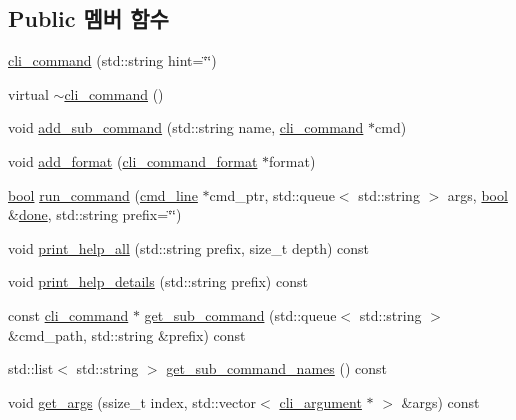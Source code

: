 \subsection*{Public 멤버 함수}
\begin{DoxyCompactItemize}
\item 
\hyperlink{classcli__command_a56351a424810733d04d6ebd096815dc7}{cli\+\_\+command} (std\+::string hint=\char`\"{}\char`\"{})
\item 
virtual \hyperlink{classcli__command_a9aad3b7d6664d5367fce7f04c2622e89}{$\sim$cli\+\_\+command} ()
\item 
void \hyperlink{classcli__command_aa73a67e8ebb6facd4b40ced66279b226}{add\+\_\+sub\+\_\+command} (std\+::string name, \hyperlink{classcli__command}{cli\+\_\+command} $\ast$cmd)
\item 
void \hyperlink{classcli__command_aa9ec38e761644d946f8db2b920e39921}{add\+\_\+format} (\hyperlink{classcli__command__format}{cli\+\_\+command\+\_\+format} $\ast$format)
\item 
\hyperlink{avb__gptp_8h_af6a258d8f3ee5206d682d799316314b1}{bool} \hyperlink{classcli__command_a8bd8ac0f5b50e8083f020aa0a88fba85}{run\+\_\+command} (\hyperlink{classcmd__line}{cmd\+\_\+line} $\ast$cmd\+\_\+ptr, std\+::queue$<$ std\+::string $>$ args, \hyperlink{avb__gptp_8h_af6a258d8f3ee5206d682d799316314b1}{bool} \&\hyperlink{mrp_validate_8c_a5992b274cfdcacdbc1fa8347fd01ebde}{done}, std\+::string prefix=\char`\"{}\char`\"{})
\item 
void \hyperlink{classcli__command_af4fd484e8365d1e440dd63ad8909599e}{print\+\_\+help\+\_\+all} (std\+::string prefix, size\+\_\+t depth) const 
\item 
void \hyperlink{classcli__command_a5fcdb7a311d37dce9894c82d557ee5e6}{print\+\_\+help\+\_\+details} (std\+::string prefix) const 
\item 
const \hyperlink{classcli__command}{cli\+\_\+command} $\ast$ \hyperlink{classcli__command_a5042df63d377c418f2dec9c935122441}{get\+\_\+sub\+\_\+command} (std\+::queue$<$ std\+::string $>$ \&cmd\+\_\+path, std\+::string \&prefix) const 
\item 
std\+::list$<$ std\+::string $>$ \hyperlink{classcli__command_a28646f04af3565ff1e1886ca1358610c}{get\+\_\+sub\+\_\+command\+\_\+names} () const 
\item 
void \hyperlink{classcli__command_aedbbfefb23383062043243359078a8df}{get\+\_\+args} (ssize\+\_\+t index, std\+::vector$<$ \hyperlink{classcli__argument}{cli\+\_\+argument} $\ast$ $>$ \&args) const 
\end{DoxyCompactItemize}
